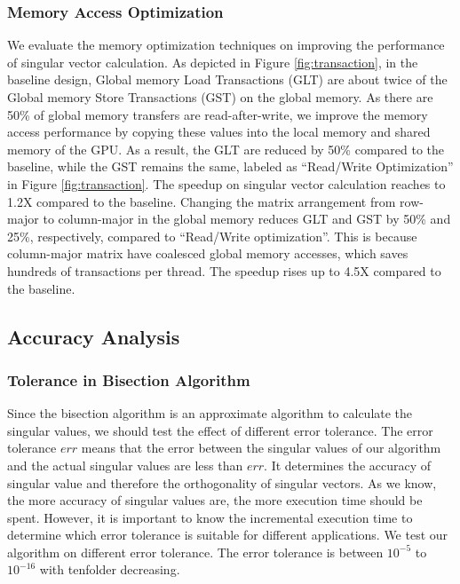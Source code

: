 \vspace{-0.2in}
\subsubsection{Memory Access Optimization}
We evaluate the memory optimization techniques on improving the performance
of singular vector calculation. As depicted in Figure \ref{fig:transaction},
in the baseline design,
Global memory Load Transactions (GLT) are about twice of the Global memory Store Transactions (GST) on the global memory.
As there are 50\% of global memory transfers are read-after-write, we improve the memory access performance by copying these values into the local memory and shared memory of the GPU. As a result, the GLT are reduced by 50\% compared to the baseline, while the GST remains the same, labeled as ``Read/Write Optimization'' in Figure \ref{fig:transaction}. The speedup on singular vector calculation reaches to 1.2X compared to the baseline.
Changing the matrix arrangement from row-major to column-major in the global memory 
reduces GLT and GST by 50\% and 25\%, respectively, compared to ``Read/Write optimization''. 
This is because column-major matrix have coalesced global memory accesses, which saves hundreds of transactions per thread. The speedup rises up to 4.5X compared to the baseline.

\vspace{-0.1in}
\subsection{Accuracy Analysis}
\subsubsection{Tolerance in Bisection Algorithm}
Since the bisection algorithm is an approximate algorithm to calculate the singular values, we should test the effect of different error tolerance.
The error tolerance $err$ means that the error between the singular values of our algorithm and the actual singular values are less than $err$.
It determines the accuracy of singular value and therefore the orthogonality of singular vectors.
As we know, the more accuracy of singular values are, the more execution time should be spent.
However, it is important to know the incremental execution time to determine which error tolerance is suitable for different applications.
We test our algorithm on different error tolerance.
The error tolerance is between $10^{-5}$ to $10^{-16}$ with tenfolder decreasing.

